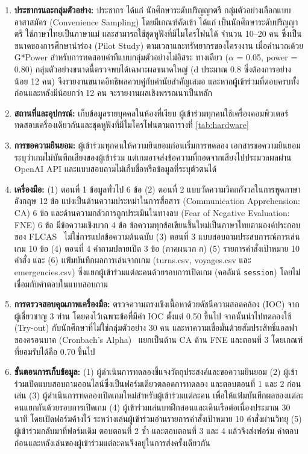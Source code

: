 \begin{enumerate}[label=\arabic*)]
    \item \textbf{ประชากรและกลุ่มตัวอย่าง:} ประชากร ได้แก่ นักศึกษาระดับปริญญาตรี กลุ่มตัวอย่างเลือกแบบอาสาสมัคร (Convenience Sampling) โดยมีเกณฑ์คัดเข้า ได้แก่ เป็นนักศึกษาระดับปริญญาตรี ใช้ภาษาไทยเป็นภาษาแม่ และสามารถใช้ชุดหูฟังที่มีไมโครโฟนได้ จำนวน 10--20 คน ซึ่งเป็นขนาดของการศึกษานำร่อง (Pilot Study) ตามเวลาและทรัพยากรของโครงงาน เมื่อคำนวณด้วย G*Power สำหรับการทดสอบค่าทีแบบกลุ่มตัวอย่างไม่อิสระ ทางเดียว ($\alpha$ = 0.05, power = 0.80) กลุ่มตัวอย่างขนาดนี้ตรวจพบได้เฉพาะผลขนาดใหญ่ (d ประมาณ 0.8 ซึ่งต้องการอย่างน้อย 12 คน) จึงรายงานขนาดอิทธิพลควบคู่กับค่านัยสำคัญเสมอ และหากผู้เข้าร่วมที่ตอบครบทั้งก่อนและหลังมีน้อยกว่า 12 คน จะรายงานผลเชิงพรรณนาเป็นหลัก
    \item \textbf{สถานที่และอุปกรณ์:} เก็บข้อมูลรายบุคคลในห้องที่เงียบ ผู้เข้าร่วมทุกคนใช้เครื่องคอมพิวเตอร์ทดสอบเครื่องเดียวกันและชุดหูฟังที่มีไมโครโฟนตามตารางที่ \ref{tab:hardware}
    \item \textbf{การขอความยินยอม:} ผู้เข้าร่วมทุกคนให้ความยินยอมก่อนเริ่มการทดลอง เอกสารขอความยินยอมระบุว่าเกมไม่บันทึกเสียงของผู้เข้าร่วม แต่เกมอาจส่งข้อความที่ถอดจากเสียงไปประมวลผลผ่าน OpenAI API และแบบสอบถามไม่เก็บชื่อหรือข้อมูลที่ระบุตัวตนได้
    \item \textbf{เครื่องมือ:} (1) ตอนที่ 1 ข้อมูลทั่วไป 6 ข้อ (2) ตอนที่ 2 แบบวัดความวิตกกังวลในการพูดภาษาอังกฤษ 12 ข้อ แบ่งเป็นด้านความประหม่าในการสื่อสาร (Communication Apprehension: CA) 6 ข้อ และด้านความกลัวการถูกประเมินในทางลบ (Fear of Negative Evaluation: FNE) 6 ข้อ มีข้อความเชิงบวก 4 ข้อ ข้อความทุกข้อเขียนขึ้นใหม่เป็นภาษาไทยตามองค์ประกอบของ FLCAS~\cite{horwitz1986} ไม่ใช่การแปลข้อความต้นฉบับ (3) ตอนที่ 3 แบบสอบถามประสบการณ์การเล่นเกม 10 ข้อ (4) ตอนที่ 4 คำถามปลายเปิด 3 ข้อ (ภาคผนวก ก) (5) รายการคำสั่งเป้าหมาย 10 คำสั่ง และ (6) แฟ้มบันทึกผลการเล่นจากเกม (turns.csv, voyages.csv และ emergencies.csv) ซึ่งแยกผู้เข้าร่วมแต่ละคนด้วยรอบการเปิดเกม (คอลัมน์ \texttt{session}) โดยไม่เชื่อมกับคำตอบในแบบสอบถาม
    \item \textbf{การตรวจสอบคุณภาพเครื่องมือ:} ตรวจความตรงเชิงเนื้อหาด้วยดัชนีความสอดคล้อง (IOC) จากผู้เชี่ยวชาญ 3 ท่าน โดยคงไว้เฉพาะข้อที่มีค่า IOC ตั้งแต่ 0.50 ขึ้นไป จากนั้นนำไปทดลองใช้ (Try-out) กับนักศึกษาที่ไม่ใช่กลุ่มตัวอย่าง 30 คน และหาความเชื่อมั่นด้วยสัมประสิทธิ์แอลฟาของครอนบาค (Cronbach's Alpha)~\cite{cronbach1951} แยกเป็นด้าน CA ด้าน FNE และตอนที่ 3 โดยเกณฑ์ที่ยอมรับได้คือ 0.70 ขึ้นไป
    \item \textbf{ขั้นตอนการเก็บข้อมูล:} (1) ผู้ดำเนินการทดลองชี้แจงวัตถุประสงค์และขอความยินยอม (2) ผู้เข้าร่วมเปิดแบบสอบถามออนไลน์ซึ่งเป็นฟอร์มเดียวตลอดการทดลอง และตอบตอนที่ 1 และ 2 ก่อนเล่น (3) ผู้ดำเนินการทดลองเปิดเกมใหม่สำหรับผู้เข้าร่วมแต่ละคน เพื่อให้แฟ้มบันทึกผลของแต่ละคนแยกกันด้วยรอบการเปิดเกม (4) ผู้เข้าร่วมเล่นบทฝึกสอนและเดินเรือต่อเนื่องประมาณ 30 นาที โดยเปิดฟอร์มค้างไว้ ระหว่างเล่นผู้เข้าร่วมอ่านรายการคำสั่งเป้าหมาย 10 คำสั่งผ่านวิทยุ (5) ผู้เข้าร่วมกลับมาที่ฟอร์มเดิม ตอบตอนที่ 2 ซ้ำ และตอบตอนที่ 3 และ 4 แล้วจึงส่งฟอร์ม คำตอบก่อนและหลังเล่นของผู้เข้าร่วมแต่ละคนจึงอยู่ในการส่งครั้งเดียวกัน

\end{enumerate}
